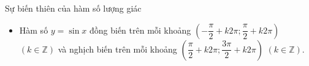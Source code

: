 
\begin{dang}{Sự biến thiên của hàm số lượng giác}
\begin{itemize}
	\item Hàm số $y = \sin x$ đồng biến trên mỗi khoảng $\left(-\dfrac{\pi}{2}+k2\pi;\dfrac{\pi}{2}+k2\pi\right)$ $(k \in \mathbb{Z})$ và nghịch biến trên mỗi khoảng $\left(\dfrac{\pi}{2}+k2\pi;\dfrac{3\pi}{2}+k2\pi\right)$ $(k \in \mathbb{Z})$.\\
	

\end{itemize}
\end{dang}
